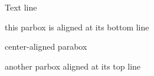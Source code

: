 \documentclass{article}
\begin{document}
Text line
\quad\parbox[b]{1.8cm}{this parbox is aligned at its bottom line}
\quad\parbox{1.5cm}{center-aligned parabox}
\quad\parbox[t]{2cm}{another parbox aligned at its top line}
\end{document}
